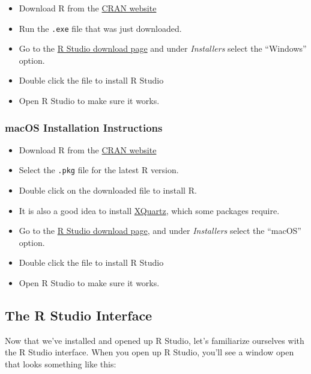 \documentclass[
]{article}
\providecommand{\tightlist}{%
  \setlength{\itemsep}{0pt}\setlength{\parskip}{0pt}}
\begin{document}
\begin{itemize}
\tightlist
\item
  Download R from the \href{https://cran.r-project.org/bin/windows/base/}{CRAN website}
\item
  Run the \texttt{.exe} file that was just downloaded.
\item
  Go to the \href{https://www.rstudio.com/products/rstudio/download/\#download}{R Studio download page} and under \emph{Installers} select the ``Windows'' option.
\item
  Double click the file to install R Studio
\item
  Open R Studio to make sure it works.
\end{itemize}

\hypertarget{macos-installation-instructions}{%
\subsubsection{macOS Installation Instructions}\label{macos-installation-instructions}}

\begin{itemize}
\tightlist
\item
  Download R from the \href{https://cran.r-project.org/bin/macosx/}{CRAN website}
\item
  Select the \texttt{.pkg} file for the latest R version.
\item
  Double click on the downloaded file to install R.
\item
  It is also a good idea to install \href{https://www.xquartz.org/}{XQuartz}, which some packages require.
\item
  Go to the \href{https://www.rstudio.com/products/rstudio/download/\#download}{R Studio download page}, and under \emph{Installers} select the ``macOS'' option.
\item
  Double click the file to install R Studio
\item
  Open R Studio to make sure it works.
\end{itemize}

\hypertarget{the-r-studio-interface}{%
\subsection{The R Studio Interface}\label{the-r-studio-interface}}

Now that we've installed and opened up R Studio, let's familiarize ourselves with the R Studio interface. When you open up R Studio, you'll see a window open that looks something like this:
\end{document}
